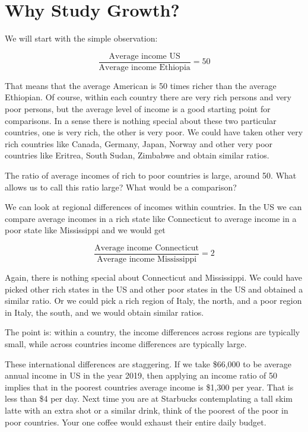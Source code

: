 \documentclass[
]{book}
\begin{document}
\hypertarget{why-study-growth}{%
\section{Why Study Growth?}\label{why-study-growth}}

We will start with the simple observation:

\[\frac{\text{Average income US}}{\text{Average income Ethiopia}} = 50\]

That means that the average American is 50 times richer than the average Ethiopian. Of course, within each country there are very rich persons and very poor persons, but the average level of income is a good starting point for comparisons. In a sense there is nothing special about these two particular countries, one is very rich, the other is very poor. We could have taken other very rich countries like Canada, Germany, Japan, Norway and other very poor countries like Eritrea, South Sudan, Zimbabwe and obtain similar ratios.

The ratio of average incomes of rich to poor countries is large, around 50. What allows us to call this ratio large? What would be a comparison?

We can look at regional differences of incomes within countries. In the US we can compare average incomes in a rich state like Connecticut to average income in a poor state like Mississippi and we would get

\[\frac{\text{Average income Connecticut}}{\text{Average income Mississippi}}=2\]

Again, there is nothing special about Connecticut and Mississippi. We could have picked other rich states in the US and other poor states in the US and obtained a similar ratio. Or we could pick a rich region of Italy, the north, and a poor region in Italy, the south, and we would obtain similar ratios.

The point is: within a country, the income differences across regions are typically small, while across countries income differences are typically large.

These international differences are staggering. If we take \$66,000 to be average annual income in US in the year 2019, then applying an income ratio of 50 implies that in the poorest countries average income is \$1,300 per year. That is less than \$4 per day. Next time you are at Starbucks contemplating a tall skim latte with an extra shot or a similar drink, think of the poorest of the poor in poor countries. Your one coffee would exhaust their entire daily budget.
\end{document}
